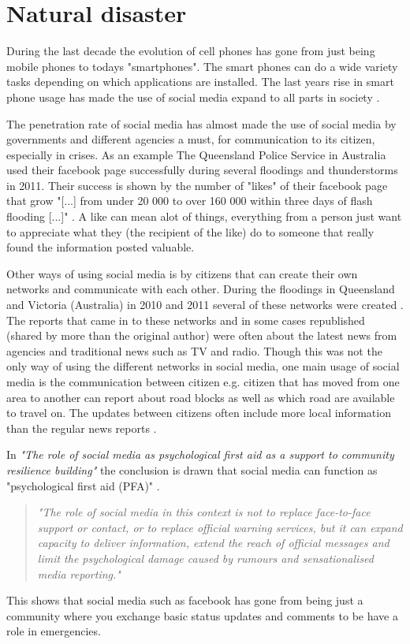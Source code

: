 \section{Natural disaster}
During the last decade the evolution of cell phones has gone from just being mobile phones to todays "smartphones".
The smart phones can do a wide variety tasks depending on which applications are installed.
The last years rise in smart phone usage has made the use of social media expand to all parts in society \cite{taylor2012}.

The penetration rate of social media has almost made the use of social media by governments and different agencies a must, for communication to its citizen, especially in crises.
As an example The Queensland Police Service in Australia used their facebook page successfully during several floodings and thunderstorms in 2011.
Their success is shown by the number of "likes" of their facebook page that grow "[...] from under 20 000 to over 160 000 within three days of flash flooding [...]" \cite{taylor2012}.
A like can mean alot of things, everything from a person just want to appreciate what they (the recipient of the like) do to someone that really found the information posted valuable.

Other ways of using social media is by citizens that can create their own networks and communicate with each other.
During the floodings in Queensland and Victoria (Australia) in 2010 and 2011 several of these networks were created \cite{bird2012}.
The reports that came in to these networks and in some cases republished (shared by more than the original author) were often about the latest news from agencies and traditional news such as TV and radio.
Though this was not the only way of using the different networks in social media, one main usage of social media is the communication between citizen e.g. citizen that has moved from one area to another can report about road blocks as well as which road are available to travel on.
The updates between citizens often include more local information than the regular news reports \cite{bird2012}.

In \textit{"The role of social media as psychological first aid as a support to community resilience building"} \cite{taylor2012} the conclusion is drawn that social media can function as "psychological first aid (PFA)" \cite{taylor2012}. 
\begin{quote}
\textit{"The role of social media in
this context is not to replace face-to-face support or contact, or to replace official warning services, but it can expand capacity to deliver information, extend the reach of official messages and limit the psychological damage caused by rumours and sensationalised media reporting."} \cite{taylor2012}
\end{quote}
This shows that social media such as facebook has gone from being just a community where you exchange basic status updates and comments to be have a role in emergencies.

